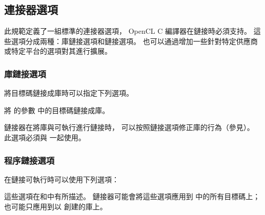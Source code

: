 \subsection{連接器選項}

此規範定義了一組標準的連接器選項， OpenCL C 編譯器在鏈接時必須支持。
這些選項分成兩種：庫鏈接選項和鏈接選項。
也可以通過增加一些針對特定供應商或特定平台的選項對其進行擴展。

\subsubsection{庫鏈接選項}

將目標碼鏈接成庫時可以指定下列選項。

將  的參數  中的目標碼鏈接成庫。
\stopclOption

鏈接器在將庫與可執行進行鏈接時，
可以按照鏈接選項修正庫的行為（參見）。
此選項必須與  一起使用。
\stopclOption

\subsubsection[sec:programLinkOption]{程序鏈接選項}

在鏈接可執行時可以使用下列選項：
\startigBase
\item {}
\item {}
\item {}
\item {}
\item {}
\stopigBase

這些選項在和中有所描述。
鏈接器可能會將這些選項應用到  中的所有目標碼上；
也可能只應用到以  創建的庫上。

